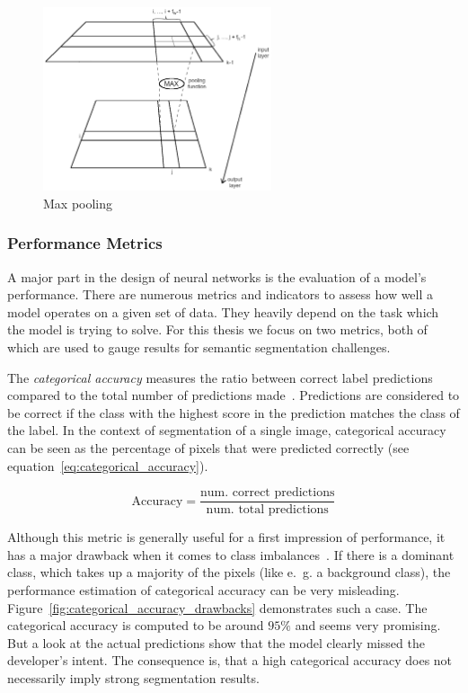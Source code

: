 \begin{figure}[h]
    \centering
    \includegraphics[width=0.6\textwidth]{images/maxpool_template}
    \caption{Max pooling}
    \label{fig:pooling}
\end{figure}

\subsubsection{Performance Metrics}
\label{sec:metrics}
A major part in the design of neural networks is the evaluation of a model's performance. There are numerous metrics and indicators to assess how well a model operates on a given set of data. They heavily depend on the task which the model is trying to solve. For this thesis we focus on two metrics, both of which are used to gauge results for semantic segmentation challenges.

The \emph{categorical accuracy} measures the ratio between correct label predictions compared to the total number of predictions made~\cite{tf_whitepaper15}. Predictions are considered to be correct if the class with the highest score in the prediction matches the class of the label. In the context of segmentation of a single image, categorical accuracy can be seen as the percentage of pixels that were predicted correctly (see equation~\ref{eq:categorical_accuracy}).

\begin{equation}
    \label{eq:categorical_accuracy}
    \text{Accuracy} = \frac{\text{num. correct predictions}}{\text{num. total predictions}}
\end{equation}

Although this metric is generally useful for a first impression of performance, it has a major drawback when it comes to class imbalances~\cite{tds_segmentation18}. If there is a dominant class, which takes up a majority of the pixels (like e.~g. a background class), the performance estimation of categorical accuracy can be very misleading. Figure~\ref{fig:categorical_accuracy_drawbacks} demonstrates such a case. The categorical accuracy is computed to be around $95\%$ and seems very promising. But a look at the actual predictions show that the model clearly missed the developer's intent. The consequence is, that a high categorical accuracy does not necessarily imply strong segmentation results.

